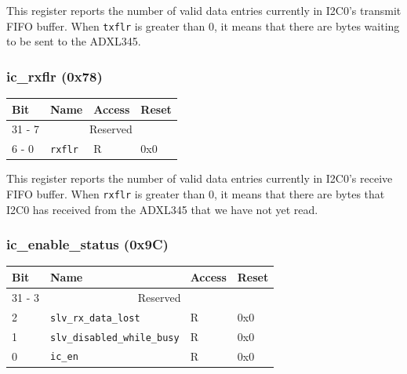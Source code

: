 \documentclass[11pt, twoside, pdftex]{article}
\begin{document}
This register reports the number of valid data entries currently in I2C0's transmit FIFO buffer. When \texttt{txflr} is greater than 0, it means that there are bytes waiting to be sent to the ADXL345.

\subsubsection{ic\_rxflr (0x78)}

\begin{table}[H]
    \centering
    \begin{tabular}{|l|l|l|l|}
        \hline
            \textbf{Bit}
            & \textbf{Name}
            & \textbf{Access}
            & \textbf{Reset}
        \\\hline
            31 - 7
            & \multicolumn{3}{|c|}{Reserved}
        \\\hline
            6 - 0
            & \texttt{rxflr}
            & R
            & 0x0
        \\\hline
    \end{tabular}
\end{table}

This register reports the number of valid data entries currently in I2C0's receive FIFO buffer. When \texttt{rxflr} is greater than 0, it means that there are bytes that I2C0 has received from the ADXL345 that we have not yet read.

\subsubsection{ic\_enable\_status (0x9C)}

\begin{table}[H]
    \centering
    \begin{tabular}{|l|l|l|l|}
        \hline
            \textbf{Bit}
            & \textbf{Name}
            & \textbf{Access}
            & \textbf{Reset}
        \\\hline
            31 - 3
            & \multicolumn{3}{|c|}{Reserved}
        \\\hline
            2
            & \texttt{slv\_rx\_data\_lost}
            & R
            & 0x0
        \\\hline
            1
            & \texttt{slv\_disabled\_while\_busy}
            & R
            & 0x0
        \\\hline
            0
            & \texttt{ic\_en}
            & R
            & 0x0
        \\\hline
    \end{tabular}
\end{table}
\end{document}
